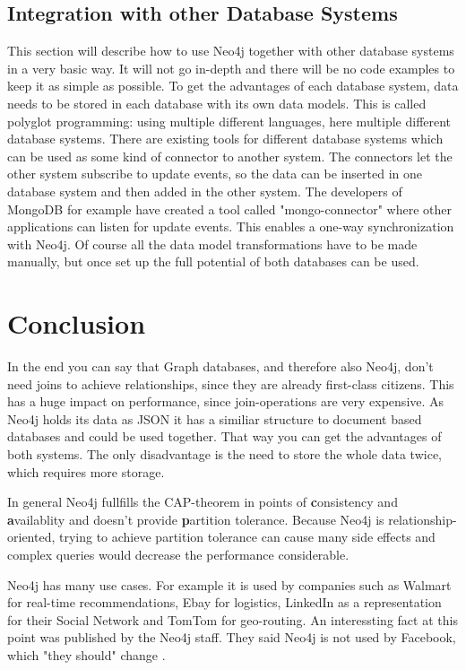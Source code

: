 \subsection{Integration with other Database Systems}
This section will describe how to use Neo4j together with other database systems in a very basic way. It will not go in-depth and there will be no code examples to keep it as simple as possible.
To get the advantages of each database system, data needs to be stored in each database with its own data models. This is called polyglot programming: using multiple different languages, here multiple different database systems. There are existing tools for different database systems which can be used as some kind of connector to another system. The connectors let the other system subscribe to update events, so the data can be inserted in one database system and then added in the other system. The developers of MongoDB for example have created a tool called "mongo-connector" where other applications can listen for update events. This enables a one-way synchronization with Neo4j. Of course all the data model transformations have to be made manually, but once set up the full potential of both databases can be used.

\section{Conclusion}

In the end you can say that Graph databases, and therefore also Neo4j, don't need joins to achieve relationships, since they are already first-class citizens. This has a huge impact on performance, since join-operations are very expensive.
As Neo4j holds its data as JSON it has a similiar structure to document based databases and could be used together. That way you can get the advantages of both systems. The only disadvantage is the need to store the whole data twice, which requires more storage.

In general Neo4j fullfills the CAP-theorem in points of \textbf{c}onsistency and \textbf{a}vailablity and doesn't provide \textbf{p}artition tolerance. Because Neo4j is relationship-oriented, trying to achieve partition tolerance can cause many side effects and complex queries would decrease the performance considerable.

Neo4j has many use cases. For example it is used by companies such as Walmart for real-time recommendations, Ebay for logistics, LinkedIn as a representation for their Social Network and TomTom for geo-routing. An interessting fact at this point was published by the Neo4j staff. They said Neo4j is not used by Facebook, which "they should" change \cite[para. 5]{Neo4jStaff.2011}.


